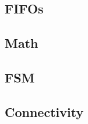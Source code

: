 \documentclass{article}
\begin{document}

\subsection{FIFOs}



















\subsection{Math}











% 

% 

% 


\subsection{FSM}




\subsection{Connectivity}
\end{document}
